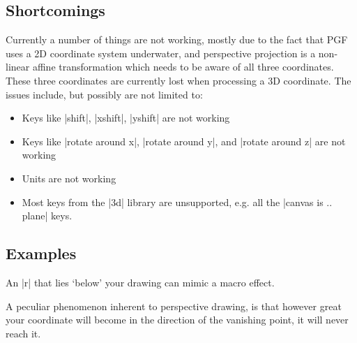 \subsection{Shortcomings}
  Currently a number of things are not working, mostly due to the fact that PGF
  uses a 2D coordinate system underwater, and perspective projection is a
  non-linear affine transformation which needs to be aware of all three
  coordinates. These three coordinates are currently lost when processing a 3D
  coordinate.
  The issues include, but possibly are not limited to:
  \begin{itemize}
    \item Keys like |shift|, |xshift|, |yshift| are not working
    \item Keys like |rotate around x|, |rotate around y|, and |rotate around z|
      are not working
    \item Units are not working
    \item Most keys from the |3d| library are unsupported, e.g. all the 
      |canvas is .. plane| keys.
  \end{itemize}

\subsection{Examples}
An |r| that lies `below' your drawing can mimic a macro effect.
\nopagebreak
\begin{codeexample}[]
\begin{tikzpicture}[
  isometric view,
  perspective={
    p = {(8,0,0)},
    q = {(0,8,0)},
    r = {(0,0,-8)}}]
  
  \simplecuboid{2}{2}{2}]

\end{tikzpicture}
\end{codeexample}

A peculiar phenomenon inherent to perspective drawing, is that however great
your coordinate will become in the direction of the vanishing point, it will
never reach it.
\nopagebreak
\begin{codeexample}[]
\end{codeexample}

